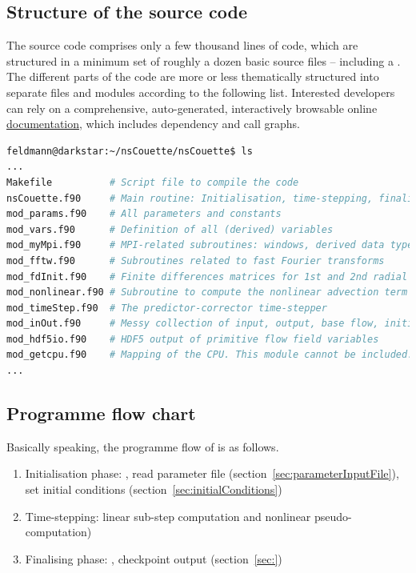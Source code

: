 \documentclass[a4paper, 11pt, DIV=11]{scrartcl}
\begin{document}

\subsection{Structure of the source code}
\label{sec:codeStructures}

The source code comprises only a few thousand lines of code, which are structured in
a minimum set of roughly a dozen basic source files -- including a .
The different parts of the code are more or less thematically structured into
separate files and \fortran modules according to the following list. Interested
developers can rely on a comprehensive, auto-generated, interactively browsable
online \href{http://mjr.pages.mpcdf.de/nscouette/ford-doc/}{ documentation},
which includes dependency and call graphs.
\begin{lstlisting}[language=bash]
feldmann@darkstar:~/nsCouette/nsCouette$ ls
...
Makefile          # Script file to compile the code
nsCouette.f90     # Main routine: Initialisation, time-stepping, finalisation
mod_params.f90    # All parameters and constants
mod_vars.f90      # Definition of all (derived) variables
mod_myMpi.f90     # MPI-related subroutines: windows, derived data types, etc.
mod_fftw.f90      # Subroutines related to fast Fourier transforms
mod_fdInit.f90    # Finite differences matrices for 1st and 2nd radial derivatives
mod_nonlinear.f90 # Subroutine to compute the nonlinear advection term (pseudo-spectral) 
mod_timeStep.f90  # The predictor-corrector time-stepper
mod_inOut.f90     # Messy collection of input, output, base flow, initial conditions etc.
mod_hdf5io.f90    # HDF5 output of primitive flow field variables
mod_getcpu.f90    # Mapping of the CPU. This module cannot be included.
...
\end{lstlisting}



\subsection{Programme flow chart}
\label{sec:programmeFlowChart}

Basically speaking, the programme flow of \nsc is as follows.
\begin{enumerate}
\item Initialisation phase: \mpi, read parameter file (section~\ref{sec:parameterInputFile}), set initial conditions (section~\ref{sec:initialConditions}) 
\item Time-stepping: linear sub-step computation and nonlinear pseudo-computation)
\item Finalising phase: \mpi, checkpoint output (section~\ref{sec:})
\end{enumerate}
\end{document}
